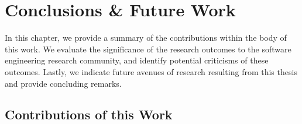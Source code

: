 \chapter{Conclusions \& Future Work}
\label{ch:conclusions}


In this chapter, we provide a summary of the contributions within the body of this work. We evaluate the significance of the research outcomes to the software engineering research community, and identify potential criticisms of these outcomes. Lastly, we indicate future avenues of research resulting from this thesis and provide concluding remarks.

\section{Contributions of this Work}

